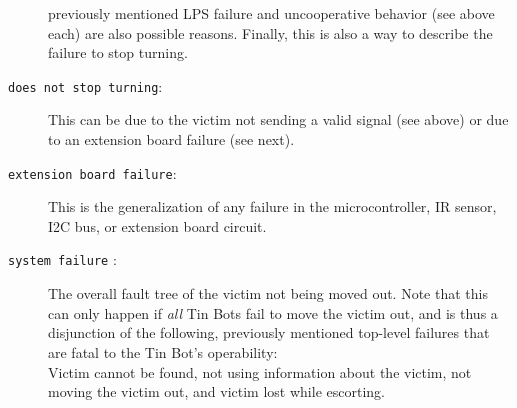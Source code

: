 \documentclass[a4paper,parskip,headheight=38pt]{scrartcl} %
\begin{document}
\begin{description}
    previously mentioned LPS failure and uncooperative behavior (see
    above each) are also possible reasons. Finally, this is also a way
    to describe the failure to stop turning.
\item[\texttt{does not stop turning}:]
    This can be due to the victim not sending a valid signal (see
    above) or due to an extension board failure (see next).
\item[\texttt{extension board failure}:]
    This is the generalization of any failure in the microcontroller,
    IR sensor, I2C bus, or extension board circuit.
\item[\texttt{system failure} \refpdf{systemfailure}:]
    The overall fault tree of the victim not being moved out.  Note
    that this can only happen if \emph{all} Tin Bots fail to move the
    victim out, and is thus a disjunction of the following, previously
    mentioned top-level failures that are fatal to the Tin Bot's
    operability:
     \\
    Victim cannot be found, not using information
    about the victim, not moving the victim out, and
    victim lost while escorting.
\end{description}
\end{document}
